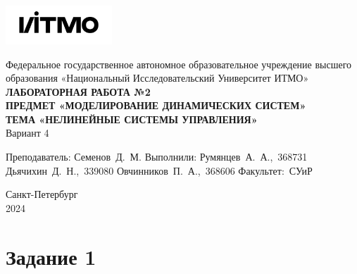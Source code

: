 \documentclass[a4paper, 12pt]{article}
\begin{document}
    \begin{titlepage}

        \begin{center}
        \includegraphics[width=0.3\textwidth]{itmo.png}
        \vfill
        
        Федеральное государственное автономное образовательное учреждение высшего образования
        «Национальный Исследовательский Университет ИТМО»\\
            
        \vfill
        {\large\bf ЛАБОРАТОРНАЯ РАБОТА №2}\\
        {\large\bf ПРЕДМЕТ «МОДЕЛИРОВАНИЕ ДИНАМИЧЕСКИХ СИСТЕМ»}\\
        {\large\bf ТЕМА «НЕЛИНЕЙНЫЕ СИСТЕМЫ УПРАВЛЕНИЯ»}\\
        Вариант 4
        \vfill

        \begin{flushright}
            \begin{minipage}{.45\textwidth}
            {
                \hbox{Преподаватель:}
                \hbox{Семенов Д. М.}
                \hbox{}
                \hbox{Выполнили:}
                \hbox{Румянцев А. А., 368731}
                \hbox{Дьячихин Д. Н., 339080}
                \hbox{Овчинников П. А., 368606}
                \hbox{}
                \hbox{Факультет: СУиР}
            }
            \end{minipage}
        \end{flushright}
        
        \vfill
                
        Санкт-Петербург\\
        2024
        \end{center}
    \end{titlepage}
    
    \tableofcontents

    \newpage
    \section{Задание 1}
\end{document}
